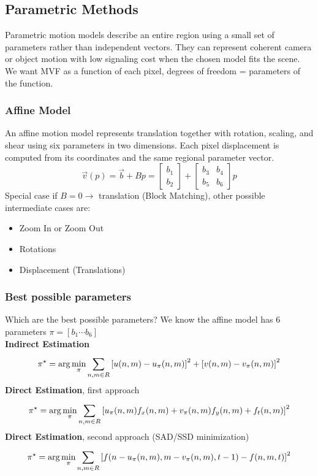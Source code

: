 \subsection{Parametric Methods}
Parametric motion models describe an entire region using a small set of parameters rather than independent vectors. They can represent coherent camera or object motion with low signaling cost when the chosen model fits the scene.
We want MVF as a function of each pixel, degrees of freedom = parameters of the function.\\
\subsubsection{Affine Model}
An affine motion model represents translation together with rotation, scaling, and shear using six parameters in two dimensions. Each pixel displacement is computed from its coordinates and the same regional parameter vector.
$$\vec{v}(p) = \vec{b} + Bp = \left[\begin{matrix}
    b_1\\
    b_2
\end{matrix}\right] + \left[\begin{matrix}
    b_3 & b_4\\
    b_5 & b_6
\end{matrix}\right]p$$
Special case if $B=0 \to$ translation (Block Matching), other possible intermediate cases are:
\begin{itemize}
    \item Zoom In or Zoom Out
    \item Rotations
    \item Displacement (Translations)
\end{itemize}
\subsubsection{Best possible parameters}
Which are the best possible parameters? We know the affine model has 6 parameters $\pi = \left[b_1 \cdots b_6\right]$\\
\textbf{Indirect Estimation}
$$\pi^\star = \arg\min_{\pi}\sum_{n,m\in R}^{}\left[u(n,m)-u_\pi(n,m)\right]^2 + \left[v(n,m)-v_\pi(n,m)\right]^2$$
\textbf{Direct Estimation}, first approach
$$\pi^\star = \arg\min_{\pi}\sum_{n,m\in R}^{}\left[u_\pi(n,m)f_x(n,m) + v_\pi(n,m)f_y(n,m) + f_t(n,m)\right]^2$$
\textbf{Direct Estimation}, second approach (SAD/SSD minimization)
$$\pi^\star = \arg\min_{\pi}\sum_{n,m\in R}^{}\left[f(n-u_\pi(n,m),m-v_\pi(n,m), t-1) - f(n,m,t)\right]^2$$
